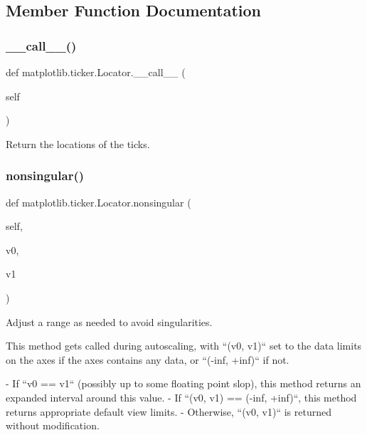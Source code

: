 \subsection{Member Function Documentation}
\mbox{\label{classmatplotlib_1_1ticker_1_1Locator_aeeb34f8825a0fd1b41e5e564e4224299}} 
\subsubsection{\texorpdfstring{\+\_\+\+\_\+call\+\_\+\+\_\+()}{\_\_call\_\_()}}
{\footnotesize\ttfamily def matplotlib.\+ticker.\+Locator.\+\_\+\+\_\+call\+\_\+\+\_\+ (\begin{DoxyParamCaption}\item[{}]{self }\end{DoxyParamCaption})}

\begin{DoxyVerb}Return the locations of the ticks.\end{DoxyVerb}
 \mbox{\label{classmatplotlib_1_1ticker_1_1Locator_a6cca034433594fb57f3a6caeb2851577}} 
\subsubsection{\texorpdfstring{nonsingular()}{nonsingular()}}
{\footnotesize\ttfamily def matplotlib.\+ticker.\+Locator.\+nonsingular (\begin{DoxyParamCaption}\item[{}]{self,  }\item[{}]{v0,  }\item[{}]{v1 }\end{DoxyParamCaption})}

\begin{DoxyVerb}Adjust a range as needed to avoid singularities.

This method gets called during autoscaling, with ``(v0, v1)`` set to
the data limits on the axes if the axes contains any data, or
``(-inf, +inf)`` if not.

- If ``v0 == v1`` (possibly up to some floating point slop), this
  method returns an expanded interval around this value.
- If ``(v0, v1) == (-inf, +inf)``, this method returns appropriate
  default view limits.
- Otherwise, ``(v0, v1)`` is returned without modification.
\end{DoxyVerb}
 \mbox{\label{classmatplotlib_1_1ticker_1_1Locator_a14627487661009bda79b81ab1a453ad2}} 
